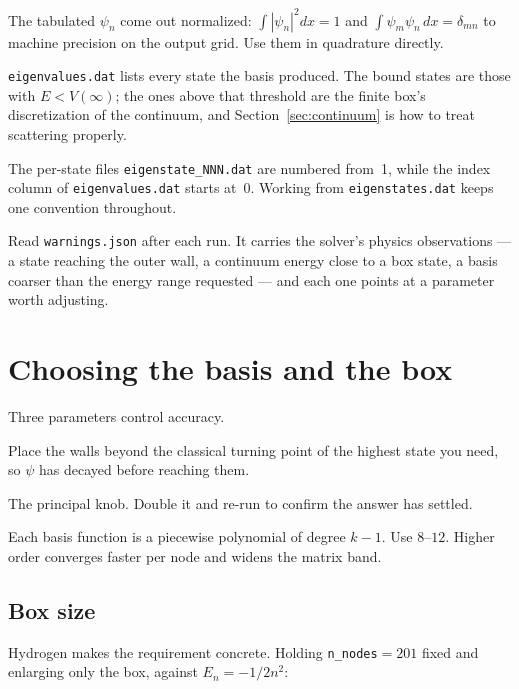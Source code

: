 \documentclass[11pt]{article}
\newcommand{\file}[1]{\texttt{#1}}
\begin{document}
The tabulated $\psi_n$ come out normalized: $\int |\psi_n|^{2} dx = 1$ and
$\int \psi_m \psi_n\,dx = \delta_{mn}$ to machine precision on the output grid.
Use them in quadrature directly.

\file{eigenvalues.dat} lists every state the basis produced. The bound states
are those with $E < V(\infty)$; the ones above that threshold are the finite
box's discretization of the continuum, and Section~\ref{sec:continuum} is how
to treat scattering properly.

The per-state files \file{eigenstate\_NNN.dat} are numbered from~1, while the
index column of \file{eigenvalues.dat} starts at~0. Working from
\file{eigenstates.dat} keeps one convention throughout.

Read \file{warnings.json} after each run. It carries the solver's physics
observations --- a state reaching the outer wall, a continuum energy close to a
box state, a basis coarser than the energy range requested --- and each one
points at a parameter worth adjusting.

\section{Choosing the basis and the box}
\label{sec:convergence}

Three parameters control accuracy.

\begin{description}[style=nextline,leftmargin=1em]
\item[{\texttt{bspline.domain} --- the box $[x_{\min}, x_{\max}]$.}]
  Place the walls beyond the classical turning point of the highest state you
  need, so $\psi$ has decayed before reaching them.
\item[\texttt{bspline.n\_nodes} --- resolution.] The principal knob. Double it
  and re-run to confirm the answer has settled.
\item[\texttt{bspline.order} --- the B-spline order $k$.] Each basis function is
  a piecewise polynomial of degree $k-1$. Use $8$--$12$. Higher order converges
  faster per node and widens the matrix band.
\end{description}

\subsection{Box size}

Hydrogen makes the requirement concrete. Holding \texttt{n\_nodes}${}=201$ fixed
and enlarging only the box, against $E_n = -1/2n^{2}$:
\end{document}

